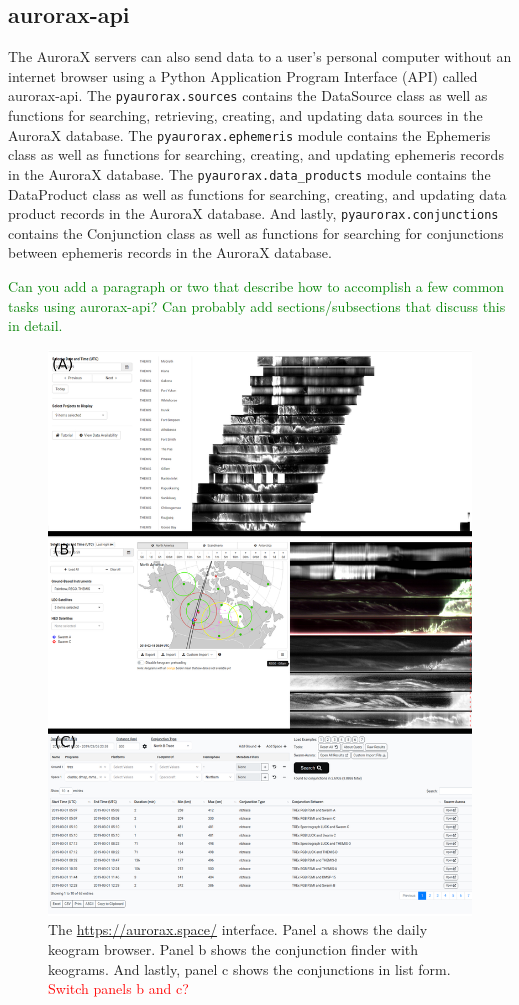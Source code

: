 \documentclass[draft]{agujournal2019}
\begin{document}
\subsection{aurorax-api}
The AuroraX servers can also send data to a user's personal computer without an internet browser using a Python Application Program Interface (API) called aurorax-api. The \verb|pyaurorax.sources| contains the DataSource class as well as functions for searching, retrieving, creating, and updating data sources in the AuroraX database. The \verb|pyaurorax.ephemeris| module contains the Ephemeris class as well as functions for searching, creating, and updating ephemeris records in the AuroraX database. The \verb|pyaurorax.data_products| module contains the DataProduct class as well as functions for searching, creating, and updating data product records in the AuroraX database. And lastly, \verb|pyaurorax.conjunctions| contains the Conjunction class as well as functions for searching for conjunctions between ephemeris records in the AuroraX database. 

\textcolor{green}{Can you add a paragraph or two that describe how to accomplish a few common tasks using aurorax-api? Can probably add sections/subsections that discuss this in detail.}

\begin{figure}
      \includegraphics[width=\textwidth]{figures/fig1.png}
      \caption{The \url{https://aurorax.space/} interface. Panel a shows the daily keogram browser. Panel b shows the conjunction finder with keograms. And lastly, panel c shows the conjunctions in list form. \textcolor{red}{Switch panels b and c?}}
      \label{fig1}
\end{figure}
\end{document}

